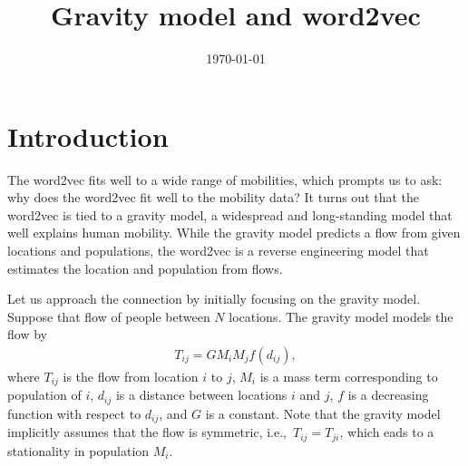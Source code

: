 \documentclass[12pt]{article} %
\def\ie{i.e.,~}
\begin{document}

\title{Gravity model and word2vec} %
\date{\today}
\maketitle %

\section{Introduction}\label{sec:introduction}

The word2vec fits well to a wide range of mobilities, which prompts us to ask: why does the word2vec fit well to the mobility data?
It turns out that the word2vec is tied to a gravity model, a widespread and long-standing model that well explains human mobility.
While the gravity model predicts a flow from given locations and populations, the word2vec is a reverse engineering model that estimates the location and population from flows.

Let us approach the connection by initially focusing on the gravity model.
Suppose that flow of people between $N$ locations. The gravity model models the flow by
\begin{align}
    T_{ij} = G M_i M_j f(d_{ij}), \label{eq:gravity_model}
\end{align}
where $T_{ij}$ is the flow from location $i$ to $j$, $M_i$ is a mass term corresponding to population of $i$, $d_{ij}$ is a distance between locations $i$ and $j$,
$f$ is a decreasing function with respect to $d_{ij}$, and $G$ is a constant.
Note that the gravity model implicitly assumes that the flow is symmetric, \ie $T_{ij}=T_{ji}$, which eads to a stationality in population $M_{i}$.
\end{document}
